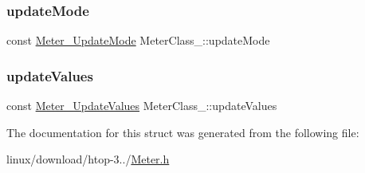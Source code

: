 \mbox{\label{structMeterClass___a08c8c40945cb0e8754e3adb23ba330f5}} 
\subsubsection{\texorpdfstring{update\+Mode}{updateMode}}
{\footnotesize\ttfamily const \hyperlink{Meter_8h_af9d3680496082005293171c69205d7f0}{Meter\+\_\+\+Update\+Mode} Meter\+Class\+\_\+\+::update\+Mode}

\mbox{\label{structMeterClass___a716f354159b5774d1d8100a3905aa8dc}} 
\subsubsection{\texorpdfstring{update\+Values}{updateValues}}
{\footnotesize\ttfamily const \hyperlink{Meter_8h_a2fcefaa066b00a9727359f6af1d02f0e}{Meter\+\_\+\+Update\+Values} Meter\+Class\+\_\+\+::update\+Values}



The documentation for this struct was generated from the following file\+:\begin{DoxyCompactItemize}
\item 
linux/download/htop-\/3../\hyperlink{Meter_8h}{Meter.\+h}\end{DoxyCompactItemize}
